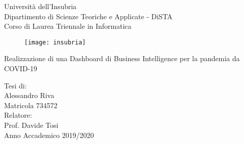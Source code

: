 \begin{titlepage}
  \begin{center}
  \begin{large}
  {\fontsize{20}{18}\selectfont\vspace*{0.50cm}Università dell'Insubria}\\
  \vspace{.1cm}
  Dipartimento di Scienze Teoriche e Applicate - DiSTA\\
  \vspace{.1cm}
  Corso di Laurea Triennale in Informatica
  \end{large}
  
  \vspace{1cm}
  \begin{figure}[h]
    \begin{center}
      \texttt{[image: insubria]}
    \end{center}
  \end{figure}
    \bigskip
    {\fontsize{25}{30}\selectfont\par
    Realizzazione di una Dashboard di Business Intelligence per la pandemia da COVID-19\par}
    \vspace{2.4cm}
    \begin{large}
    Tesi di:\\
    Alessandro Riva\\
    Matricola 734572\\
    \vspace{2.3cm}
    Relatore:\\
    Prof. Davide Tosi\\
    \vfill
    Anno Accademico 2019/2020
    \end{large}
    

  \end{center}
\end{titlepage}